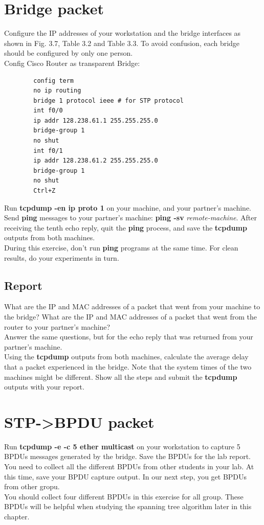 \documentclass[10pt,a4paper]{article}
\numberwithin{equation}{section}
\numberwithin{figure}{section}
\numberwithin{table}{section}
\begin{document}
\section{Bridge packet}
    Configure the IP addresses of your workstation and the bridge interfaces as shown in Fig. 3.7, Table 3.2 and Table 3.3.
    To avoid confusion, each bridge should be configured by only one person. \\
    Config Cisco Router as transparent Bridge:
    \begin{verbatim}
        config term
        no ip routing
        bridge 1 protocol ieee # for STP protocol
        int f0/0
        ip addr 128.238.61.1 255.255.255.0
        bridge-group 1
        no shut
        int f0/1
        ip addr 128.238.61.2 255.255.255.0
        bridge-group 1
        no shut
        Ctrl+Z
    \end{verbatim}
    Run \textbf{tcpdump -en ip proto 1} on your machine, and your partner’s machine. Send \textbf{ping} messages to your partner’s machine: \textbf{ping -sv} \textit{remote-machine}.
    After receiving the tenth echo reply, quit the \textbf{ping} process, and save the \textbf{tcpdump} outputs from both machines. \\
    During this exercise, don’t run \textbf{ping} programs at the same time. For clean results, do your experiments in turn.
    \subsection*{Report}
    What are the IP and MAC addresses of a packet that went from your machine to the bridge?
    What are the IP and MAC addresses of a packet that went from the router to your partner’s machine? \\
    Answer the same questions, but for the echo reply that was returned from your partner’s machine. \\
    Using the \textbf{tcpdump} outputs from both machines, calculate the average delay that a packet experienced in the bridge.
    Note that the system times of the two machines might be different.
    Show all the steps and submit the \textbf{tcpdump} outputs with your report.


\section{STP->BPDU packet}
    Run \textbf{tcpdump -e -c 5 ether multicast} on your workstation to capture 5 BPDUs messages generated by the bridge.
    Save the BPDUs for the lab report. \\
    You need to collect all the different BPDUs from other students in your lab.
    At this time, save your BPDU capture output. 
    In our next step,  you get BPDUs from other gropu. \\
    You should collect four different BPDUs in this exercise for all group.
    These BPDUs will be helpful when studying the spanning tree algorithm later in this chapter.
\end{document}
